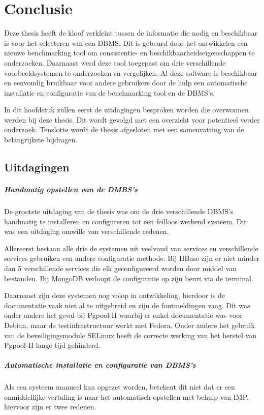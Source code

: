 \chapter{Conclusie}\label{sec:conclusie}
Deze thesis heeft de kloof verkleint tussen de informatie die nodig en beschikbaar is voor het selecteren van een DBMS. Dit is gebeurd door het ontwikkelen een nieuwe benchmarking tool om consistentie- en beschikbaarheidseigenschappen te onderzoeken. Daarnaast werd deze tool toegepast om drie verschillende voorbeeldsystemen te onderzoeken en vergelijken. Al deze software is beschikbaar en eenvoudig bruikbaar voor andere gebruikers door de hulp een automatische installatie en configuratie van de benchmarking tool en de DBMS's. 

In dit hoofdstuk zullen eerst de uitdagingen besproken worden die overwonnen werden bij deze thesis. Dit wordt gevolgd met een overzicht voor potentieel verder onderzoek. Tenslotte wordt de thesis afgesloten met een samenvatting van de belangrijkste bijdragen. 

\section{Uitdagingen}
\paragraph{Handmatig opstellen van de DMBS's} De grootste uitdaging van de thesis was om de drie verschillende DBMS's handmatig te installeren en configureren tot een feilloos werkend systeem. Dit was een uitdaging omwille van verschillende redenen. 

Allereerst bestaan alle drie de systemen uit veelvoud van services en verschillende services gebruiken een andere configuratie methode. Bij HBase zijn er niet minder dan 5 verschillende services die elk geconfigureerd worden door middel van bestanden. Bij MongoDB verloopt de configuratie op zijn beurt via de terminal. 

Daarnaast zijn deze systemen nog volop in ontwikkeling, hierdoor is de documentatie vaak niet al te uitgebreid en zijn de foutmeldingen vaag. Dit was onder andere het geval bij Pgpool-II waarbij er enkel documentatie was voor Debian, maar de testinfrastructuur werkt met Fedora. Onder andere het gebruik van de beveiligingsmodule SELinux heeft de correcte werking van het herstel van Pgpool-II lange tijd gehinderd. 

\paragraph{Automatische installatie en configuratie van DBMS's} Als een systeem manueel kan opgezet worden, betekent dit niet dat er een onmiddellijke vertaling is naar het automatisch opstellen met behulp van IMP, hiervoor zijn er twee redenen. 

